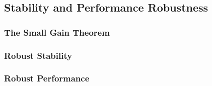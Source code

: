 \subsection{Stability and Performance Robustness}
\subsubsection{The Small Gain Theorem}
\subsubsection{Robust Stability}
\subsubsection{Robust Performance}


